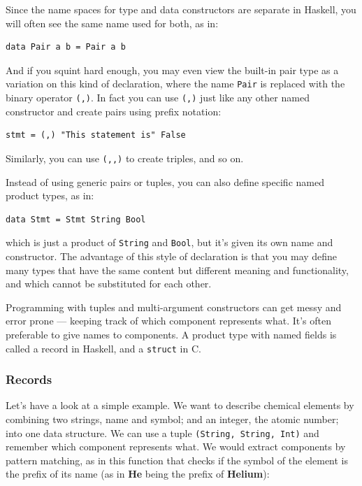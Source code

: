 Since the name spaces for type and data constructors are separate in
Haskell, you will often see the same name used for both, as in:

\begin{verbatim}
data Pair a b = Pair a b
\end{verbatim}

And if you squint hard enough, you may even view the built-in pair type
as a variation on this kind of declaration, where the name \texttt{Pair}
is replaced with the binary operator \texttt{(,)}. In fact you can use
\texttt{(,)} just like any other named constructor and create pairs
using prefix notation:

\begin{verbatim}
stmt = (,) "This statement is" False
\end{verbatim}

Similarly, you can use \texttt{(,,)} to create triples, and so on.

Instead of using generic pairs or tuples, you can also define specific
named product types, as in:

\begin{verbatim}
data Stmt = Stmt String Bool
\end{verbatim}

which is just a product of \texttt{String} and \texttt{Bool}, but it's
given its own name and constructor. The advantage of this style of
declaration is that you may define many types that have the same content
but different meaning and functionality, and which cannot be substituted
for each other.

Programming with tuples and multi-argument constructors can get messy
and error prone --- keeping track of which component represents what.
It's often preferable to give names to components. A product type with
named fields is called a record in Haskell, and a \texttt{struct} in C.

\subsubsection{Records}\label{records}

Let's have a look at a simple example. We want to describe chemical
elements by combining two strings, name and symbol; and an integer, the
atomic number; into one data structure. We can use a tuple
\texttt{(String,\ String,\ Int)} and remember which component represents
what. We would extract components by pattern matching, as in this
function that checks if the symbol of the element is the prefix of its
name (as in \textbf{He} being the prefix of \textbf{Helium}):

